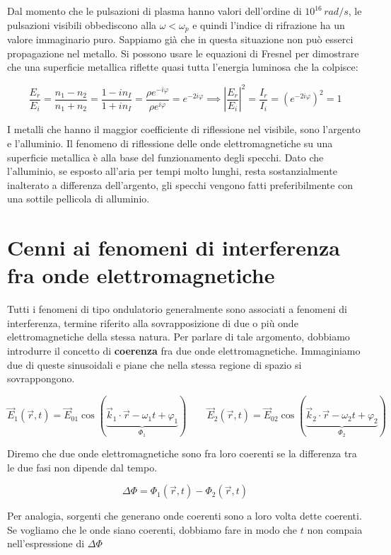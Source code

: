 Dal momento che le pulsazioni di plasma hanno valori dell'ordine di $10^{16}\,rad/s$, le pulsazioni visibili obbediscono alla $\omega<\omega_p$ e quindi l'indice di rifrazione ha un valore immaginario puro. Sappiamo già che in questa situazione non può esserci propagazione nel metallo. Si possono usare le equazioni di Fresnel per dimostrare che una superficie metallica riflette quasi tutta l'energia luminosa che la colpisce:

\[
	\frac{E_r}{E_i} = \frac{n_1-n_2}{n_1+n_2} = \frac{1-in_I}{1+in_I} = \frac{\rho e^{-i\varphi}}{\rho e^{i\varphi}} = e^{-2i\varphi} \implies \left|\frac{E_r}{E_i}\right|^2 = \frac{I_r}{I_i} = \left( e^{-2i\varphi}  \right)^2 = 1
\]

I metalli che hanno il maggior coefficiente di riflessione nel visibile, sono l'argento e l'alluminio. Il fenomeno di riflessione delle onde elettromagnetiche su una superficie metallica è alla base del funzionamento degli specchi. Dato che l'alluminio, se esposto all'aria per tempi molto lunghi, resta sostanzialmente inalterato a differenza dell'argento, gli specchi vengono fatti preferibilmente con una sottile pellicola di alluminio.

\section{Cenni ai fenomeni di interferenza fra onde elettromagnetiche}

Tutti i fenomeni di tipo ondulatorio generalmente sono associati a fenomeni di interferenza, termine riferito alla sovrapposizione di due o più onde elettromagnetiche della stessa natura. Per parlare di tale argomento, dobbiamo introdurre il concetto di \textbf{coerenza} fra due onde elettromagnetiche. Immaginiamo due di queste sinusoidali e piane che nella stessa regione di spazio si sovrappongono.

\[
	\vec{E}_1(\vec{r},t) = \vec{E}_{01}\cos (\underbrace{\vec{k}_1\cdot \vec{r} -\omega_1 t + \varphi_1}_{\Phi_1}) \qquad \vec{E}_2(\vec{r},t) = \vec{E}_{02}\cos (\underbrace{\vec{k}_2\cdot \vec{r} -\omega_2 t + \varphi_2}_{\Phi_2})
\]

Diremo che due onde elettromagnetiche sono fra loro coerenti se la differenza tra le due fasi non dipende dal tempo.

\[
	\Delta \Phi = \Phi_1 (\vec{r},t) - \Phi_2 (\vec{r}, t)
\]

Per analogia, sorgenti che generano onde coerenti sono a loro volta dette coerenti.
Se vogliamo che le onde siano coerenti, dobbiamo fare in modo che $t$ non compaia nell'espressione di $ \Delta \Phi  $

